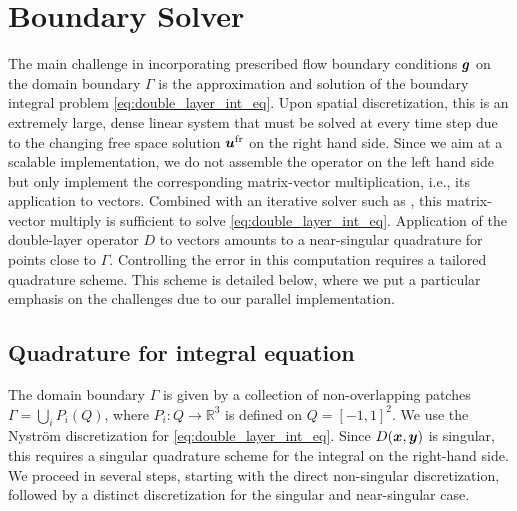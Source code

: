 

\section{Boundary Solver\label{sec:solver}}

The main challenge in incorporating prescribed flow boundary conditions
$\bm{g}$ on the domain boundary $\Gamma$ is the approximation and
solution of the boundary integral problem
\cref{eq:double_layer_int_eq}. Upon spatial discretization, this is an
extremely large, dense linear system that must be solved at every time
step due to the changing free space solution ${\bm{u}}^{\text{fr}}$ on the right hand side. Since we aim at a scalable
implementation, we do not assemble the operator on the left hand side
but only implement the corresponding matrix-vector multiplication, i.e., its application to
vectors. Combined with an iterative solver such as \gmres, this matrix-vector multiply is sufficient to solve
\cref{eq:double_layer_int_eq}. Application of the double-layer
operator $D$ to vectors amounts to a near-singular quadrature for
points close to $\Gamma$. Controlling the error in this computation
requires a tailored quadrature scheme. This scheme is detailed below,
where we put a particular emphasis on the challenges due to our 
parallel implementation.



\subsection{Quadrature for integral equation}

The domain boundary $\Gamma$ is given by a collection of
non-overlapping patches $\Gamma = \bigcup_i P_i(Q)$, where $P_i:Q
\rightarrow \mathbb{R}^3$ is defined on $Q=[-1,1]^2$.  We use the
Nystr\"om discretization for \cref{eq:double_layer_int_eq}.  Since $D({\bm{x}},{\bm{y}})$
is singular, this requires a singular quadrature scheme for the integral on the
right-hand side.
We proceed in several steps, starting with the direct non-singular
discretization, followed by a distinct discretization for the
singular and near-singular case.

